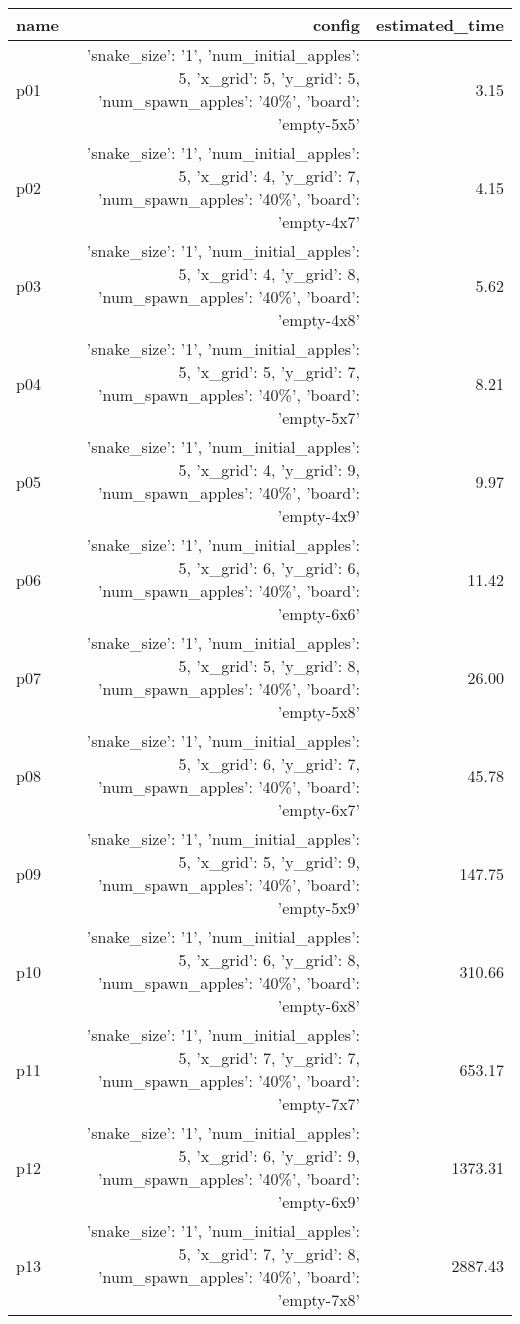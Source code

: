 \documentclass{article}
\begin{document}
                            \begin{center}
                            \scriptsize
                            \begin{tabular}{@{}l|r|r@{}}
                            name & config & estimated\_time\\\midrule
                              p01&{'snake\_size': '1', 'num\_initial\_apples': 5, 'x\_grid': 5, 'y\_grid': 5, 'num\_spawn\_apples': '40\%', 'board': 'empty-5x5'}&3.15\\
  p02&{'snake\_size': '1', 'num\_initial\_apples': 5, 'x\_grid': 4, 'y\_grid': 7, 'num\_spawn\_apples': '40\%', 'board': 'empty-4x7'}&4.15\\
  p03&{'snake\_size': '1', 'num\_initial\_apples': 5, 'x\_grid': 4, 'y\_grid': 8, 'num\_spawn\_apples': '40\%', 'board': 'empty-4x8'}&5.62\\
  p04&{'snake\_size': '1', 'num\_initial\_apples': 5, 'x\_grid': 5, 'y\_grid': 7, 'num\_spawn\_apples': '40\%', 'board': 'empty-5x7'}&8.21\\
  p05&{'snake\_size': '1', 'num\_initial\_apples': 5, 'x\_grid': 4, 'y\_grid': 9, 'num\_spawn\_apples': '40\%', 'board': 'empty-4x9'}&9.97\\
  p06&{'snake\_size': '1', 'num\_initial\_apples': 5, 'x\_grid': 6, 'y\_grid': 6, 'num\_spawn\_apples': '40\%', 'board': 'empty-6x6'}&11.42\\
  p07&{'snake\_size': '1', 'num\_initial\_apples': 5, 'x\_grid': 5, 'y\_grid': 8, 'num\_spawn\_apples': '40\%', 'board': 'empty-5x8'}&26.00\\
  p08&{'snake\_size': '1', 'num\_initial\_apples': 5, 'x\_grid': 6, 'y\_grid': 7, 'num\_spawn\_apples': '40\%', 'board': 'empty-6x7'}&45.78\\
  p09&{'snake\_size': '1', 'num\_initial\_apples': 5, 'x\_grid': 5, 'y\_grid': 9, 'num\_spawn\_apples': '40\%', 'board': 'empty-5x9'}&147.75\\
  p10&{'snake\_size': '1', 'num\_initial\_apples': 5, 'x\_grid': 6, 'y\_grid': 8, 'num\_spawn\_apples': '40\%', 'board': 'empty-6x8'}&310.66\\
  p11&{'snake\_size': '1', 'num\_initial\_apples': 5, 'x\_grid': 7, 'y\_grid': 7, 'num\_spawn\_apples': '40\%', 'board': 'empty-7x7'}&653.17\\
  p12&{'snake\_size': '1', 'num\_initial\_apples': 5, 'x\_grid': 6, 'y\_grid': 9, 'num\_spawn\_apples': '40\%', 'board': 'empty-6x9'}&1373.31\\
  p13&{'snake\_size': '1', 'num\_initial\_apples': 5, 'x\_grid': 7, 'y\_grid': 8, 'num\_spawn\_apples': '40\%', 'board': 'empty-7x8'}&2887.43\\

\end{tabular}
\end{center}
\end{document}
